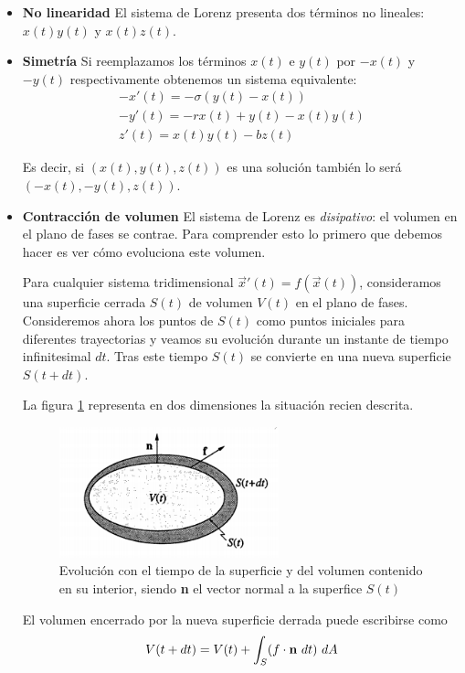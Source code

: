 \begin{itemize}
\item \textbf{No linearidad}
El sistema de Lorenz presenta dos términos no lineales: $x(t)y(t)$ y $x(t)z(t)$.

\item \textbf{Simetría}
Si reemplazamos los términos $x(t)$ e $y(t)$ por $-x(t)$ y $-y(t)$ respectivamente obtenemos un sistema equivalente:
\[\begin{array}{l}
-x'(t) = -σ(y(t)-x(t)) \\
-y'(t) = -rx(t)+y(t)-x(t)y(t)\\
z'(t) = x(t)y(t)-bz(t)
\end{array}\]

Es decir, si $(x(t),y(t),z(t))$ es una solución también lo será $(-x(t),-y(t),z(t))$.

\item \textbf{Contracción de volumen}
El sistema de Lorenz es \emph{disipativo}: el volumen en el plano de fases se contrae. Para comprender esto lo primero que debemos hacer es ver cómo evoluciona este volumen.

Para cualquier sistema tridimensional $\vec{x}'(t) =f(\vec{x}(t))$, consideramos una superficie cerrada $S(t)$ de volumen $V(t)$ en el plano de fases. Consideremos ahora los puntos de $S(t)$ como puntos iniciales para diferentes trayectorias y veamos su evolución durante un instante de tiempo infinitesimal $dt$. Tras este tiempo $S(t)$ se convierte en una nueva superficie $S(t+dt)$.

La figura \ref{fig:volumen2D} representa en dos dimensiones la situación recien descrita.
\begin{figure}[hbtp]
\centering
\includegraphics[width = 0.6\textwidth]{img/volumen2D.png}
\caption{Evolución con el tiempo de la superficie y del volumen contenido en su interior, siendo \textbf{n} el vector normal a la superfice $S(t)$}
\label{fig:volumen2D}
\end{figure}

El volumen encerrado por la nueva superficie derrada puede escribirse como
\[V(t+dt)=V(t) + \int_S (f\cdot \text{\textbf{n}}\ dt)\ dA\]


\end{itemize}
